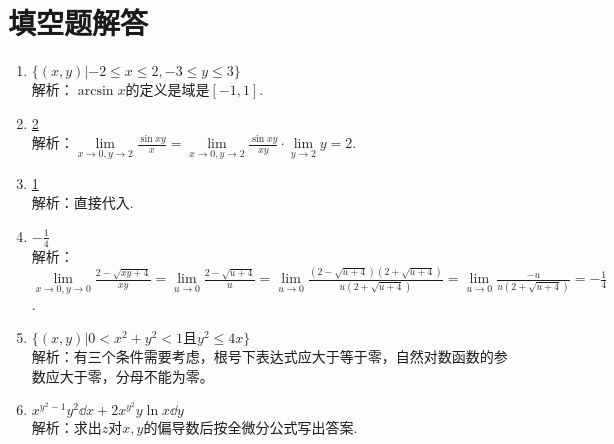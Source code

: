 \section{填空题解答}
\begin{enumerate}
	\item \underline{$ \{ (x,y) | -2\leqslant x \leqslant 2, -3\leqslant y \leqslant 3 \} $}\\
		解析：$ \arcsin x $的定义是域是$ [-1,1] $.
	\item \underline{2}\\
		解析：$\lim\limits_{x\to 0,y\to 2} \frac{\sin xy}{x} = \lim\limits_{x\to 0,y\to 2} \frac{\sin xy}{xy} \cdot \lim\limits_{y\to 2}y = 2 $.
	\item \underline{1}\\
		解析：直接代入.
	\item \underline{$-\frac{1}{4}$}\\
		解析：$ \lim\limits_{x\to 0,y\to 0} \frac{2-\sqrt{xy+4}}{xy} = \lim\limits_{u\to 0} \frac{2-\sqrt{u+4}}{u} = \lim\limits_{u\to 0} \frac{(2-\sqrt{u+4})(2+\sqrt{u+4})}{u(2+\sqrt{u+4})} = \lim\limits_{u\to 0} \frac{-u}{u(2+\sqrt{u+4})} = -\frac{1}{4} $.
	\item \underline{$ \{ (x,y)|0 < x^2+y^2 < 1 \text{且} y^2\leqslant 4x \} $}\\
		解析：有三个条件需要考虑，根号下表达式应大于等于零，自然对数函数的参数应大于零，分母不能为零。
	\item \underline{$ x^{y^2-1}y^2\dd x + 2x^{y^2}y\ln x \dd y $}\\
		解析：求出$ z $对$ x,y$的偏导数后按全微分公式写出答案.
\end{enumerate}
